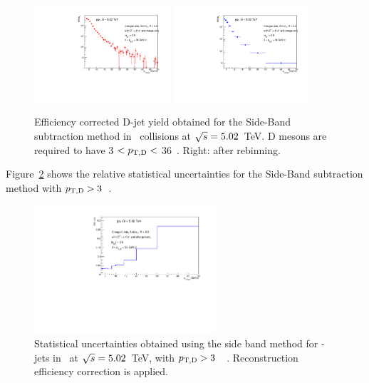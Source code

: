 \begin{figure}[bth]
\centering
\includegraphics[width=0.45\textwidth]{pPbcuts_2sig/jetPtSpectrum_SB_pTD3}
\includegraphics[width=0.45\textwidth]{pPbcuts_2sig/jetPtSpectrum_SB_Rebin_pTD3}
\caption{Efficiency corrected D-jet yield obtained for the Side-Band subtraction method in \pp\ collisions at $\sqrt{s}=5.02$~TeV. D mesons are required to have 3 $< p_{\mathrm{T,D}}<$ 36~\GeVc. Right: after rebinning.}
\label{fig:eq_pPb_Directjet_corrSum}
\end{figure}


Figure~\ref{fig:JetPt_pPb_SBUnc_Dzero} shows the relative statistical uncertainties for the Side-Band subtraction method with $p_{\mathrm{T,D}}>3$~\GeVc. %

\begin{figure}[bth]
\centering
\includegraphics[width=0.6\textwidth]{pPbcuts_2sig/jetPtSpectrumUnc_SB_Rebin_pTD3}
\caption{Statistical uncertainties obtained using the side band method for \Dzero-jets in \pp\ at $\sqrt{s}=5.02$~TeV, with $p_{\mathrm{T,D}}>3$~\GeVc\ . Reconstruction efficiency correction is applied.}
\label{fig:JetPt_pPb_SBUnc_Dzero}
\end{figure}



